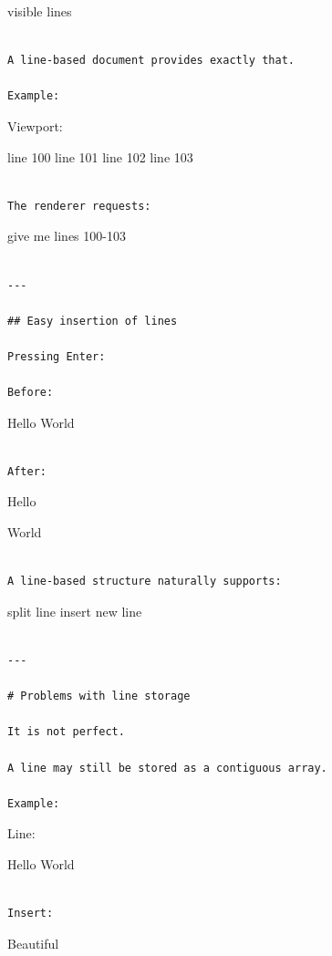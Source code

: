 \documentclass[
  oneside,
  openany]{book}
\begin{document}
visible lines

\begin{verbatim}

A line-based document provides exactly that.

Example:
\end{verbatim}

Viewport:

line 100 line 101 line 102 line 103

\begin{verbatim}

The renderer requests:
\end{verbatim}

give me lines 100-103

\begin{verbatim}

---

## Easy insertion of lines

Pressing Enter:

Before:
\end{verbatim}

Hello World

\begin{verbatim}

After:
\end{verbatim}

Hello

World

\begin{verbatim}

A line-based structure naturally supports:
\end{verbatim}

split line insert new line

\begin{verbatim}

---

# Problems with line storage

It is not perfect.

A line may still be stored as a contiguous array.

Example:
\end{verbatim}

Line:

Hello World

\begin{verbatim}

Insert:
\end{verbatim}

Beautiful
\end{document}
